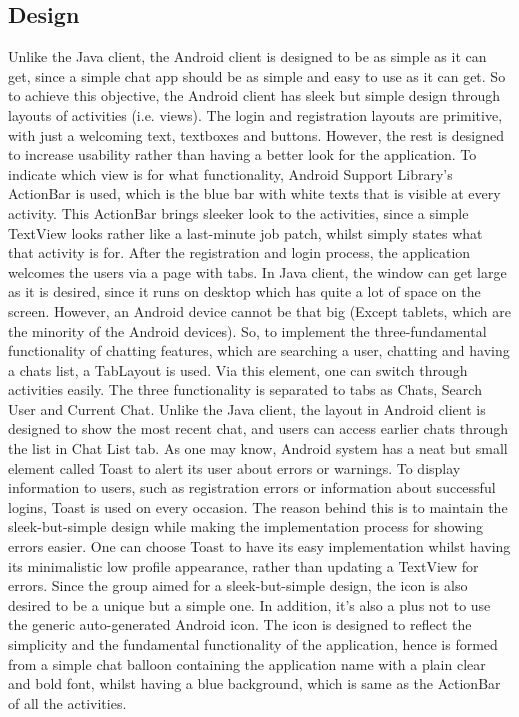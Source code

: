 \documentclass[11pt,a4paper]{report}
\begin{document}
\subsection{Design}
Unlike the Java client, the Android client is designed to be as simple as it can get, since a simple chat app should be as simple and easy to use as it can get. So to achieve this objective, the Android client has sleek but simple design through layouts of activities (i.e. views).
The login and registration layouts are primitive, with just a welcoming text, textboxes and buttons. However, the rest is designed to increase usability rather than having a better look for the application.
To indicate which view is for what functionality, Android Support Library’s ActionBar is used, which is the blue bar with white texts that is visible at every activity. This ActionBar brings sleeker look to the activities, since a simple TextView looks rather like a last-minute job patch, whilst simply states what that activity is for.
After the registration and login process, the application welcomes the users via a page with tabs. In Java client, the window can get large as it is desired, since it runs on desktop which has quite a lot of space on the screen. However, an Android device cannot be that big (Except tablets, which are the minority of the Android devices). So, to implement the three-fundamental functionality of chatting features, which are searching a user, chatting and having a chats list, a TabLayout is used. Via this element, one can switch through activities easily. The three functionality is separated to tabs as Chats, Search User and Current Chat. Unlike the Java client, the layout in Android client is designed to show the most recent chat, and users can access earlier chats through the list in Chat List tab.
As one may know, Android system has a neat but small element called Toast to alert its user about errors or warnings. To display information to users, such as registration errors or information about successful logins, Toast is used on every occasion. The reason behind this is to maintain the sleek-but-simple design while making the implementation process for showing errors easier. One can choose Toast to have its easy implementation whilst having its minimalistic low profile appearance, rather than updating a TextView for errors.
Since the group aimed for a sleek-but-simple design, the icon is also desired to be a unique but a simple one. In addition, it’s also a plus not to use the generic auto-generated Android icon. The icon is designed to reflect the simplicity and the fundamental functionality of the application, hence is formed from a simple chat balloon containing the application name with a plain clear and bold font, whilst having a blue background, which is same as the ActionBar of all the activities.
\end{document}
